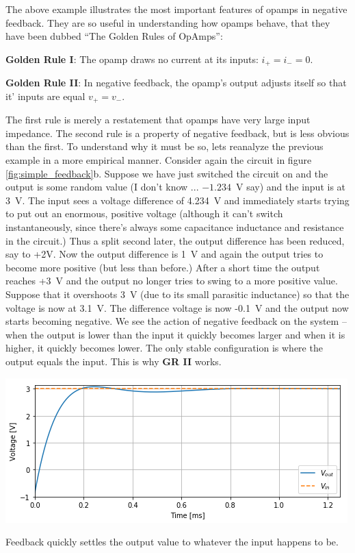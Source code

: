 \documentclass{tufte-book}
\begin{document}
The above example illustrates the most important features of opamps in negative feedback. They are so useful in understanding how opamps behave, that they have been dubbed ``The Golden Rules of OpAmps'':

\textbf{Golden Rule I}: The opamp draws no current at its inputs: $i_+ = i_- = 0$.

\textbf{Golden Rule II}: In negative feedback, the opamp's output adjusts itself so that it' inputs are equal $v_+ = v_-$.

The first rule is merely a restatement that opamps have very large input impedance. The second rule is a property of negative feedback, but is less obvious than the first. To understand why it must be so, lets reanalyze the previous example in a more empirical manner. Consider again the circuit in figure \ref{fig:simple_feedback}b. Suppose we have just switched the circuit on and the output is some random value (I don't know ... $-1.234$~V say) and the input is at 3~V. The input sees a voltage difference of 4.234~V and immediately starts trying to put out an enormous, positive voltage (although it can't switch instantaneously, since there's always some capacitance inductance and resistance in the circuit.) Thus a split second later, the output difference has been reduced, say to +2V. Now the output difference is 1~V and again the output tries to become more positive (but less than before.) After a short time the output reaches +3~V and the output no longer tries to swing to a more positive value. Suppose that it overshoots 3~V (due to its small parasitic inductance) so that the voltage is now at 3.1~V. The difference voltage is now -0.1~V and the output now starts becoming negative. We see the action of negative feedback on the system -- when the output is lower than the input it quickly becomes larger and when it is higher, it quickly becomes lower. The only stable configuration is where the output equals the input. This is why \textbf{GR II} works. 

\begin{marginfigure}%
  \includegraphics[width=\linewidth]{feedback_time_dep}
  \caption{Feedback quickly settles the output value to whatever the input happens to be.}
  \label{fig:feedback_time_dep}
\end{marginfigure}
\end{document}

